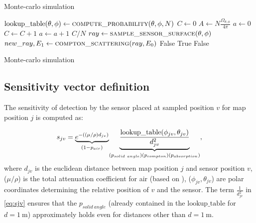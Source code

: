 \begin{algorithm}[h!]
\caption{Monte-carlo simulation}\label{alg:cap}
\begin{algorithmic}
      \State $\mathrm{lookup\_table}(\theta, \phi) \gets \Call{compute\_probability}{\theta, \phi, N}$
    \EndFor
  \EndFor
\EndFunction
\Statex
{}
\State $C \gets 0$
\State $A \gets N\frac{\Omega_{\theta, \phi}}{4 \pi}$ 
\State $a \gets 0$
   
  \State $C \gets C + 1 $ 
  \EndIf
  \State $a \gets a + 1$
\EndWhile
  \State \Return $C/N$ 
  \EndFunction
\Statex
  \State $ray \gets \Call{sample\_sensor\_surface}{\theta,\phi}$ 
   
  \State $new\_ray, E_{1} \gets \Call{compton\_scattering}{ray, E_{0}}$ %
  \Else{}
    \State \Return False 
  \EndIf
    
    \State \Return True
  \Else{}
    \State \Return False
  \EndIf
\EndFunction
\end{algorithmic}
  \label{alg:monte}
  \caption{Monte-carlo simulation}
\end{algorithm}


\subsection{Sensitivity vector definition}%
The sensitivity of detection by the sensor placed at sampled position $v$ for map position $j$ is computed as:

\begin{equation}
  s_{jv} = \underset{(1-p_{air})}{\underbrace{e^{-((\mu/\rho) d_{jv})} }} \underset{(p_{solid\ angle})\\(p_{compton})\\(p_{absorption})} {\underbrace{\frac{\mathrm{lookup\_table}(\phi_{jv}, \theta_{jv})}{d^{2}_{jv}}}},  
  \label{eq:sjv}
\end{equation}
where $d_{jv}$ is the euclidean distance between map position $j$ and sensor position $v$, ($\mu/\rho$) is the total attenuation coefficient for air (based on \cite{nist}), ($\phi_{jv}, \theta_{jv}$) are polar coordinates determining the relative position of $v$ and the sensor. 
The term $\frac{1}{d^{2}_{jv}}$ in \ref{eq:sjv} ensures that the $p_{solid\ angle}$ (already contained in the $\mathrm{lookup\_table}$ for $d = \SI{1}\meter$) approximately holds even for distances other than $d = \SI{1}\meter$.

